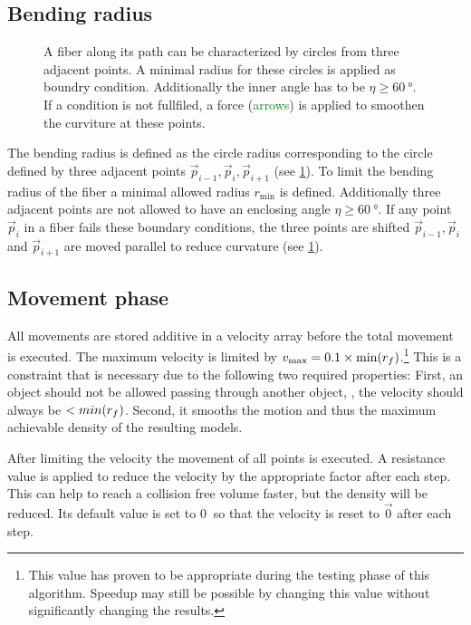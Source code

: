 \subsection{Bending radius}
%
\begin{figure}[!t]
    \centering
    \setlength{\tikzheight}{.75\textwidth}
	\caption{A fiber along its path can be characterized by circles from three adjacent points. A minimal radius for these circles is applied as boundry condition. Additionally the inner angle has to be $\eta \geq \SI{60}{\degree}$. If a condition is not fullfiled, a force (\textcolor{GREEN}{arrows}) is applied to smoothen the curviture at these points.}
	\label{fig:modelCircle}
\end{figure}
%
The bending radius is defined as the circle radius corresponding to the circle defined by three adjacent points $\vec{p}_{i-1}, \vec{p}_{i}, \vec{p}_{i+1}$ (see \cref{fig:modelCircle}).
To limit the bending radius of the fiber a minimal allowed radius $r_{\min}$ is defined.
Additionally three adjacent points are not allowed to have an enclosing angle $\eta \geq \SI{60}{\degree}$.
If any point $\vec{p}_{i}$ in a fiber fails these boundary conditions, the three points are shifted $\vec{p}_{i-1}, \vec{p}_{i}$ and $\vec{p}_{i+1}$ are moved parallel to reduce curvature (see \cref{fig:modelCircle}).
%
% 
% 
\subsection{Movement phase}
% 
All movements are stored additive in a velocity array before the total movement is executed.
The maximum velocity is limited by $v_{\max} = 0.1 \times \min(\mathit{\textnormal{$r_f$}})$.\footnote{This value has proven to be appropriate during the testing phase of this algorithm. Speedup may still be possible by changing this value without significantly changing the results.}
This is a constraint that is necessary due to the following two required properties:
First, an object should not be allowed passing through another object, \ie{}, the velocity should always be $<min(\textnormal{$r_f$})$.
Second, it smooths the motion and thus the maximum achievable density of the resulting models.
\par
% 
After limiting the velocity the movement of all points is executed.
A resistance value is applied to reduce the velocity by the appropriate factor after each step.
This can help to reach a collision free volume faster, but the density will be reduced.
Its default value is set to $\SI{0}{}$ so that the velocity is reset to $\vec{0}$ after each step.
% 
% 
% 
